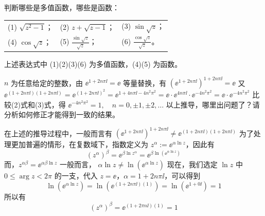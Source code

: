 \begin{question}
判断哪些是多值函数，哪些是函数：
\begin{center}
\begin{tabular}{lll}
(1) \(\sqrt{z^2 - 1}\)； &
(2) \(z + \sqrt{z - 1}\)； &
(3) \(\sin \sqrt{z}\)； \\
(4) \(\cos \sqrt{z}\)； &
(5) \(\displaystyle \frac{\sin \sqrt{z}}{\sqrt{z}}\)； &
(6) \(\displaystyle \frac{\cos \sqrt{z}}{\sqrt{z}}\)。
\end{tabular}
\end{center}
\begin{solution}
上述表达式中 (1)(2)(3)(6) 为多值函数，(4)(5) 为函数。
\end{solution}
\end{question}

\begin{question}
\(n\) 为任意给定的整数，由 \( \ee^{1+2n \pi \ii} = \ee \) 等量替换，有 \( (\ee^{1+2n \pi \ii})^{1+2n \pi \ii} = \ee \)
又 \( \ee^{(1+2n \pi \ii)(1+2n \pi \ii)} = \ee^{(1+2n \pi \ii)^2}=\ee^{1+4n \pi \ii - 4n^2 \pi^2}=\ee \cdot \ee^{4n \pi \ii} \cdot \ee^{-4n^2 \pi^2}=\ee \cdot \ee^{-4n^2 \pi^2} \)
比较(2)式和(3)式，得 \( \ee^{-4n^2 \pi^2}=1, \quad n=0, \pm 1, \pm 2, \dots \)
以上推导，哪里出问题了？请分析如何修正才能得到一致的结果。
\begin{solution}
在上述的推导过程中，一般而言有 \( (\ee^{1+2n \pi \ii})^{1+2n \pi \ii} \neq \ee^{(1+2n \pi \ii)(1+2n \pi \ii)} \)
为了处理更加普遍的情形，在复数域下，指数定义为 \(z^\alpha := \ee^{\alpha \ln z}\)，因此有 \[
(z^{\alpha})^\beta = \ee^{\beta \ln z^\alpha} = \ee^{\beta \ln (\ee^{\alpha \ln z})}
\]
而，\( z^{\alpha \beta}= \ee^{\alpha \beta \ln z} \)
一般而言， \( \alpha \ln z \neq \ln (\ee^{\alpha \ln z}) \)
现在，我们选定 \(\ln z\) 中 \(0 \le \arg z < 2\pi\) 的一支，代入 \(z=\ee\)，\(\alpha = 1+2n \pi \ii\)，可以得到 \[
\ln(\ee^{\alpha \ln z}) =\ln (\ee^{(1+2n \pi \ii)(1)})=\ln (\ee^{1+0 \ii})=1
\]
所以有 \[
(z^{\alpha})^{\beta}= \ee^{(1+2\pi n \ii)(1)} =1
\]
\end{solution}
\end{question}
